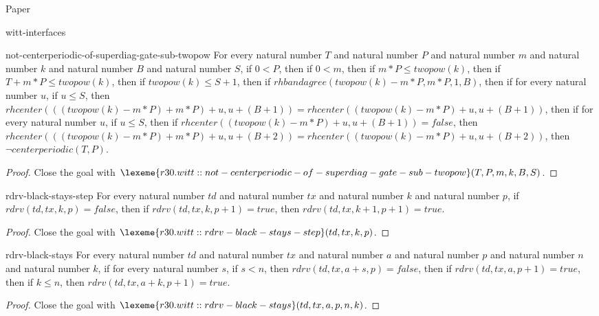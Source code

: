 \begin{lexlean}{Paper}
\begin{section}{witt-interfaces}
  \begin{theorem}{not-centerperiodic-of-superdiag-gate-sub-twopow}
  For every natural number \(T\) and natural number \(P\) and natural number \(m\) and natural number \(k\) and natural number \(B\) and natural number \(S\), if \(0 < P\), then if \(0 < m\), then if \(m * P ≤ twopow(k)\), then if \(T + m * P ≤ twopow(k)\), then if \(twopow(k) ≤ S + 1\), then if \(rhbandagree(twopow(k) - m * P, m * P, 1, B)\), then if for every natural number \(u\), if \(u ≤ S\), then \(rhcenter(((twopow(k) - m * P) + m * P) + u, u + (B + 1)) = rhcenter((twopow(k) - m * P) + u, u + (B + 1))\), then if for every natural number \(u\), if \(u ≤ S\), then if \(rhcenter((twopow(k) - m * P) + u, u + (B + 1)) = false\), then \(rhcenter(((twopow(k) - m * P) + m * P) + u, u + (B + 2)) = rhcenter((twopow(k) - m * P) + u, u + (B + 2))\), then \(¬ centerperiodic(T, P)\).
  \begin{proof}
  Close the goal with \(\lexeme{r30.witt::not-centerperiodic-of-superdiag-gate-sub-twopow}(T, P, m, k, B, S)\).
  \end{proof}
  \end{theorem}

  \begin{theorem}{rdrv-black-stays-step}
  For every natural number \(td\) and natural number \(tx\) and natural number \(k\) and natural number \(p\), if \(rdrv(td, tx, k, p) = false\), then if \(rdrv(td, tx, k, p + 1) = true\), then \(rdrv(td, tx, k + 1, p + 1) = true\).
  \begin{proof}
  Close the goal with \(\lexeme{r30.witt::rdrv-black-stays-step}(td, tx, k, p)\).
  \end{proof}
  \end{theorem}

  \begin{theorem}{rdrv-black-stays}
  For every natural number \(td\) and natural number \(tx\) and natural number \(a\) and natural number \(p\) and natural number \(n\) and natural number \(k\), if for every natural number \(s\), if \(s < n\), then \(rdrv(td, tx, a + s, p) = false\), then if \(rdrv(td, tx, a, p + 1) = true\), then if \(k ≤ n\), then \(rdrv(td, tx, a + k, p + 1) = true\).
  \begin{proof}
  Close the goal with \(\lexeme{r30.witt::rdrv-black-stays}(td, tx, a, p, n, k)\).
  \end{proof}
  \end{theorem}


\end{section}
\end{lexlean}
